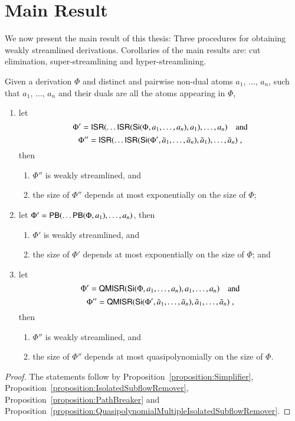 \chapter{Main Result}\label{chapter:MainResult}

We now present the main result of this thesis: Three procedures for obtaining weakly streamlined derivations. Corollaries of the main results are: cut elimination, super-streamlining and hyper-streamlining.

\begin{theorem}\label{theorem:WeakStreamlining}
Given a derivation $\Phi$ and distinct and pairwise non-dual atoms $a_1$, $\dots$, $a_n$, such that $a_1$, $\dots$, $a_n$ and their duals are all the atoms appearing in $\Phi$,
\begin{enumerate}
\item let
\[\Phi'=\mathsf{ISR}(\dots\mathsf{ISR}(\mathsf{Si}(\Phi,a_1,\dots,a_n),a_1),\dots,a_n)\quad\mbox{and}\]
\[\Phi''=\mathsf{ISR}(\dots\mathsf{ISR}(\mathsf{Si}(\Phi',\bar a_1,\dots,\bar a_n),\bar a_1),\dots,\bar a_n)\;,\]
then
\begin{enumerate}
\item $\Phi''$ is weakly streamlined, and
\item the size of $\Phi''$ depends at most exponentially on the size of\/ $\Phi$;
\end{enumerate}
\item let\/ $\Phi'=\mathsf{PB}(\dots\mathsf{PB}(\Phi,a_1),\dots,a_n)$, then
\begin{enumerate}
\item $\Phi'$ is weakly streamlined, and
\item the size of\/ $\Phi'$ depends at most exponentially on the size of\/ $\Phi$; and
\end{enumerate}
\item let
\[\Phi'=\mathsf{QMISR}(\mathsf{Si}(\Phi,a_1,\dots,a_n),a_1,\dots,a_n)\quad\mbox{and}\]
\[\Phi''=\mathsf{QMISR}(\mathsf{Si}(\Phi',\bar a_1,\dots,\bar a_n),\bar a_1,\dots,\bar a_n)\;,\]
then
\begin{enumerate}
\item $\Phi''$ is weakly streamlined, and
\item the size of\/ $\Phi''$ depends at most quasipolynomially on the size of\/ $\Phi$.
\end{enumerate}
\end{enumerate}
\end{theorem}

\begin{proof}
The statements follow by Proposition~\vref{proposition:Simplifier}, Proposition~\vref{proposition:IsolatedSubflowRemover}, Proposition~\vref{proposition:PathBreaker} and Proposition~\vref{proposition:QuasipolynomialMultipleIsolatedSubflowRemover}.
\end{proof}

